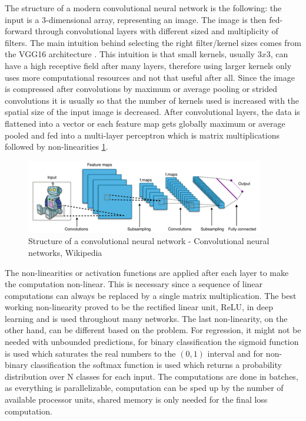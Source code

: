 \documentclass[a4paper,12pt]{article}
\begin{document}
\par The structure of a modern convolutional neural network is the following: the input is a 3-dimensional array, representing an image. The image is then fed-forward through convolutional layers with different sized and multiplicity of filters. The main intuition behind selecting the right filter/kernel sizes comes from the VGG16 architecture \cite{simonyan2014very}. This intuition is that small kernels, usually $3x3$, can have a high receptive field after many layers, therefore using larger kernels only uses more computational resources and not that useful after all. Since the image is compressed after convolutions by maximum or average pooling or strided convolutions it is usually so that the number of kernels used is increased with the spatial size of the input image is decreased. After convolutional layers, the data is flattened into a vector or each feature map gets globally maximum or average pooled and fed into a multi-layer perceptron which is matrix multiplications followed by non-linearities \ref{fig:modern-cnn}.

\vspace{4mm}

\begin{figure}[H]
    \centering
    \includegraphics[width=.8\linewidth]{wiki_cnn.png}
    \caption{Structure of a convolutional neural network - Convolutional neural networks, Wikipedia}
    \label{fig:modern-cnn}
\end{figure}

\vspace{4mm}

\par The non-linearities or activation functions are applied after each layer to make the computation non-linear. This is necessary since a sequence of linear computations can always be replaced by a single matrix multiplication. The best working non-linearity proved to be the rectified linear unit, ReLU,  in deep learning and is used throughout many networks. The last non-linearity, on the other hand, can be different based on the problem. For regression, it might not be needed with unbounded predictions, for binary classification the sigmoid function is used which saturates the real numbers to the $(0, 1)$ interval and for non-binary classification the softmax function is used which returns a probability distribution over N classes for each input. The computations are done in batches, as everything is parallelizable, computation can be sped up by the number of available processor units, shared memory is only needed for the final loss computation.
\end{document}
